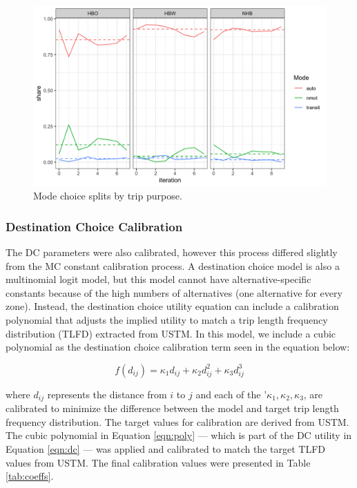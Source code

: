  \begin{figure}

  {\centering \includegraphics[width=0.75\linewidth]{figures/chapter3/MC_split.png}

  }

  \caption{Mode choice splits by trip purpose.}\label{fig:nhbmc}
  \end{figure}

\subsubsection{Destination Choice Calibration}

The DC parameters were also calibrated, however this process differed slightly
from the MC constant calibration process. A destination choice model is also a
multinomial logit model, but this model cannot have alternative-specific
constants because of the high numbers of alternatives (one alternative for
every zone). Instead, the destination choice utility equation can include a
calibration polynomial that adjusts the implied utility to match a trip length
frequency distribution (TLFD) extracted from USTM. In this model, we include a
cubic polynomial as the destination choice calibration term seen in the
equation below:

\begin{equation}
  f(d_{ij}) = \kappa_1 d_{ij} + \kappa_2 d_{ij}^2 + \kappa_3 d_{ij}^3
	\label{eqn:poly}
\end{equation}

\noindent where $d_{ij}$ represents the distance from $i$ to $j$
and each of the  '$\kappa_1,\kappa_2,\kappa_3$, are calibrated to minimize the
difference between the model and target trip length frequency distribution. The target
values for calibration are derived from USTM. The cubic polynomial in
Equation \ref{eqn:poly} --- which is part of the DC utility in
Equation \ref{eqn:dc} --- was applied and calibrated to match the target TLFD
values from USTM. The final calibration values  were presented in Table
\ref{tab:coeffs}.


